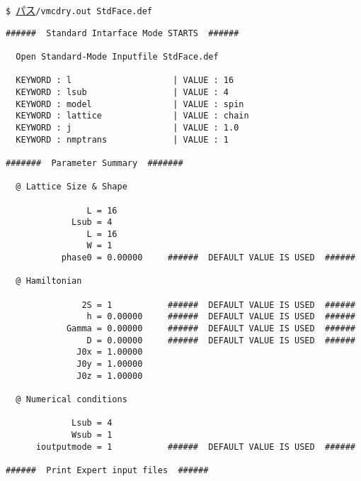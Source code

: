 \vspace{1cm}\hspace{-0.7cm}
\verb|$ |\underline{パス}\verb|/vmcdry.out StdFace.def|
\small
\begin{verbatim}
######  Standard Intarface Mode STARTS  ######

  Open Standard-Mode Inputfile StdFace.def 

  KEYWORD : l                    | VALUE : 16 
  KEYWORD : lsub                 | VALUE : 4 
  KEYWORD : model                | VALUE : spin 
  KEYWORD : lattice              | VALUE : chain 
  KEYWORD : j                    | VALUE : 1.0 
  KEYWORD : nmptrans             | VALUE : 1 

#######  Parameter Summary  #######

  @ Lattice Size & Shape

                L = 16 
             Lsub = 4         
                L = 16        
                W = 1         
           phase0 = 0.00000     ######  DEFAULT VALUE IS USED  ######

  @ Hamiltonian 

               2S = 1           ######  DEFAULT VALUE IS USED  ######
                h = 0.00000     ######  DEFAULT VALUE IS USED  ######
            Gamma = 0.00000     ######  DEFAULT VALUE IS USED  ######
                D = 0.00000     ######  DEFAULT VALUE IS USED  ######
              J0x = 1.00000   
              J0y = 1.00000   
              J0z = 1.00000   

  @ Numerical conditions

             Lsub = 4         
             Wsub = 1         
      ioutputmode = 1           ######  DEFAULT VALUE IS USED  ######

######  Print Expert input files  ######


\end{verbatim}
